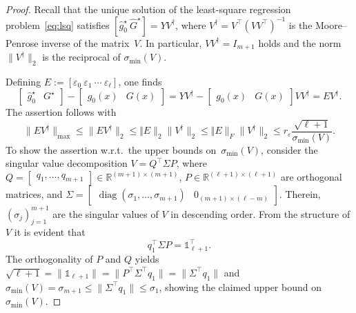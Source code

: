 \documentclass[a4paper, reqno]{amsart}
\newcommand{\dd}{\ell}
\newcommand{\one}{\mathds{1}}
\begin{document}
\begin{proof}
    Recall that the unique solution of the least-square regression problem~\eqref{eq:lsq} satisfies $\left[ \hat{g}_0^\star\  \widehat{G}^\star \right] = Y V^\dagger$,
        where $V^\dagger = V^\top (V V^\top)^{-1}$ is the Moore--Penrose inverse of the matrix~$V$. 
    In particular, $VV^\dagger = I_{m+1}$ holds and the norm $\lVert V^\dagger\rVert_2$ is the reciprocal of $\sigma_{\min}(V)$. 
    
    Defining $E:=[\varepsilon_0\ \varepsilon_1\ \cdots\ \varepsilon_{\dd}]$, one finds
    \begin{equation*}
        \begin{bmatrix}
            \hat{g}_0^\star & G^\star
        \end{bmatrix} - \begin{bmatrix}
            g_0(x) & G(x)
        \end{bmatrix} = 
            Y V^\dagger
         - \begin{bmatrix}
            g_0(x) & G(x)
        \end{bmatrix} VV^\dagger = E V^\dagger.
    \end{equation*}
    The assertion follows with
    \begin{equation*}
        \lVert E V^\dagger\rVert_\mathrm{max}\leq\lVert E V^\dagger\rVert_2 \leq \Vert E\rVert_2 \lVert V^\dagger\rVert_2 \leq \Vert E\rVert_F \lVert V^\dagger\rVert_2
            \leq r_\varepsilon\frac{\sqrt{\dd+1}}{\sigma_{\min}(V)}.
    \end{equation*}
    To show the assertion w.r.t.\ the upper bounds on~$\sigma_{\min}(V)$, consider the singular value decomposition $V=Q^\top \Sigma P$, where $Q=\begin{bmatrix}
        q_1,\dots, q_{m+1}
    \end{bmatrix}\in\mathbb R^{(m+1)\times(m+1)}$, $P\in\mathbb R^{(\dd+1)\times(\dd+1)}$ are orthogonal matrices, and $\Sigma = \begin{bmatrix}
        \operatorname{diag}(\sigma_{1},\dots, \sigma_{m+1}) & 0_{(m+1)\times (\dd-m)}
    \end{bmatrix}$. Therein, $(\sigma_j)_{j=1}^{m+1}$ are the singular values of $V$ in descending order. 
    From the structure of $V$ it is evident that 
    \begin{equation}\label{eq:q1}
        q_1^\top \Sigma P = \one_{\dd+1}^\top.
    \end{equation} The orthogonality of $P$ and $Q$ yields $\sqrt{\dd+1} = \lVert \one_{\dd+1} \rVert = \lVert P^\top \Sigma^\top q_1\rVert = \lVert \Sigma^\top q_1\rVert$ and $\sigma_\mathrm{min}(V)=\sigma_{m+1} \leq \lVert \Sigma^\top q_1\rVert \leq \sigma_1$, showing the claimed upper bound on $\sigma_\mathrm{min}(V)$.

\end{proof}
\end{document}
